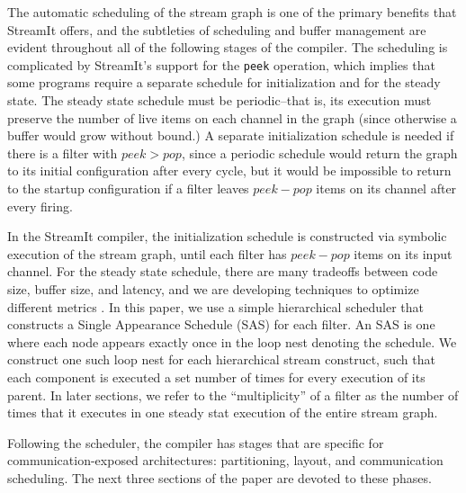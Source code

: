 The automatic scheduling of the stream graph is one of the primary
benefits that StreamIt offers, and the subtleties of scheduling and
buffer management are evident throughout all of the following stages
of the compiler.  The scheduling is complicated by StreamIt's support
for the {\tt peek} operation, which implies that some programs require
a separate schedule for initialization and for the steady state.  The
steady state schedule must be periodic--that is, its execution must
preserve the number of live items on each channel in the graph (since
otherwise a buffer would grow without bound.)  A separate
initialization schedule is needed if there is a filter with $peek >
pop$, since a periodic schedule would return the graph to its initial
configuration after every cycle, but it would be impossible to return
to the startup configuration if a filter leaves $peek-pop$ items on
its channel after every firing.

In the StreamIt compiler, the initialization schedule is constructed
via symbolic execution of the stream graph, until each filter has
$peek-pop$ items on its input channel.  For the steady state schedule,
there are many tradeoffs between code size, buffer size, and latency,
and we are developing techniques to optimize different metrics
\cite{streamittech2}.  In this paper, we use a simple hierarchical
scheduler that constructs a Single Appearance Schedule \cite{leesdf}
(SAS) for each filter.  An SAS is one where each node appears exactly
once in the loop nest denoting the schedule.  We construct one such
loop nest for each hierarchical stream construct, such that each
component is executed a set number of times for every execution of its
parent.  In later sections, we refer to the ``multiplicity'' of a
filter as the number of times that it executes in one steady stat
execution of the entire stream graph.

Following the scheduler, the compiler has stages that are specific for
communication-exposed architectures: partitioning, layout, and
communication scheduling.  The next three sections of the paper are
devoted to these phases.



